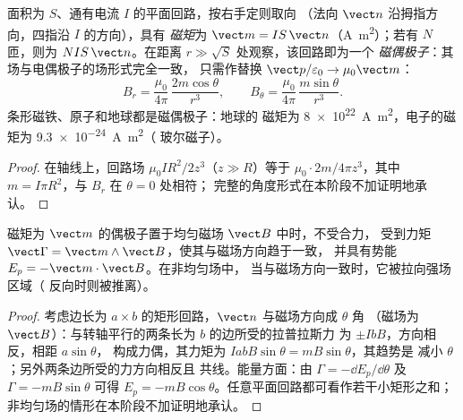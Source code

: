 \begin{definition}[磁矩]\label{def:b1:magnetostatics:moment}
面积为 $S$、通有电流 $I$ 的平面回路，按右手定则取向
（法向 $\vect n$ 沿拇指方向，四指沿 $I$ 的方向），具有
\emph{磁矩}为 $\vect m = IS\,\vect n$（\unit{A.m^2}）；若有 $N$
匝，则为 $NIS\,\vect n$。在距离 $r \gg \sqrt S$ 处观察，该回路即为一个
\emph{磁偶极子}：其场与电偶极子的场形式完全一致，
只需作替换 $\vect p/\varepsilon_0 \to \mu_0\vect m$：
\[
B_r = \frac{\mu_0}{4\pi}\,\frac{2m\cos\theta}{r^3}, \qquad
B_\theta = \frac{\mu_0}{4\pi}\,\frac{m\sin\theta}{r^3} .
\]
条形磁铁、原子和地球都是磁偶极子：地球的
磁矩为 \qty{8e22}{A.m^2}，电子的磁矩为 \qty{9.3e-24}{A.m^2}（
玻尔磁子）。
\end{definition}

\begin{proof}
在轴线上，回路场 $\mu_0IR^2/2z^3$（$z \gg R$）等于
$\mu_0 \cdot 2m/4\pi z^3$，其中 $m = I\pi R^2$，与 $B_r$ 在 $\theta = 0$ 处相符；
完整的角度形式在本阶段不加证明地承认。
\end{proof}

\begin{theorem}[场中的偶极子]\label{thm:b1:magnetostatics:dipoleinfield}
磁矩为 $\vect m$ 的偶极子置于均匀磁场 $\vect B$ 中时，不受合力，
受到力矩 $\vect\Gamma = \vect m\wedge\vect B$，使其与磁场方向趋于一致，
并具有势能 $E_p = -\vect m\cdot\vect B$。在非均匀场中，
当与磁场方向一致时，它被拉向强场区域（
反向时则被推离）。
\end{theorem}

\begin{proof}
考虑边长为 $a \times b$ 的矩形回路，$\vect n$ 与磁场方向成 $\theta$ 角
（磁场为 $\vect B$）：与转轴平行的两条长为 $b$ 的边所受的拉普拉斯力
为 $\pm IbB$，方向相反，相距 $a\sin\theta$，
构成力偶，其力矩为 $IabB\sin\theta = mB\sin\theta$，其趋势是
减小 $\theta$；另外两条边所受的力方向相反且
共线。能量方面：由 $\Gamma = -\dd E_p/\dd\theta$ 及 $\Gamma = -mB\sin\theta$
可得 $E_p = -mB\cos\theta$。任意平面回路都可看作若干小矩形之和；
非均匀场的情形在本阶段不加证明地承认。
\end{proof}

